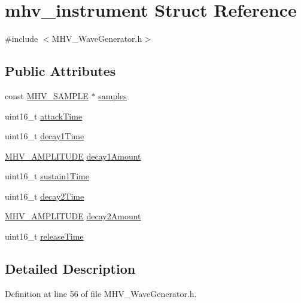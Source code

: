 \hypertarget{structmhv__instrument}{\section{mhv\-\_\-instrument Struct Reference}
\label{structmhv__instrument}
}


{\ttfamily \#include $<$M\-H\-V\-\_\-\-Wave\-Generator.\-h$>$}

\subsection*{Public Attributes}
\begin{DoxyCompactItemize}
\item 
const \hyperlink{_m_h_v___d_a_c_8h_a5ed12db0bcd6a3870733daecfb30e640}{M\-H\-V\-\_\-\-S\-A\-M\-P\-L\-E} $\ast$ \hyperlink{structmhv__instrument_a1a3dd705816f79c9f44da16743f38516}{samples}
\item 
uint16\-\_\-t \hyperlink{structmhv__instrument_a9b85066674551959ac0ef4d57bedfcb5}{attack\-Time}
\item 
uint16\-\_\-t \hyperlink{structmhv__instrument_a8ba9f75ad91b531d497d18bad6351d9d}{decay1\-Time}
\item 
\hyperlink{_m_h_v___wave_generator_8h_ae0ff00bbcfd596fc3d6afab09bb5e11c}{M\-H\-V\-\_\-\-A\-M\-P\-L\-I\-T\-U\-D\-E} \hyperlink{structmhv__instrument_a922f4e32b9e9c1b7e685124845fed1ad}{decay1\-Amount}
\item 
uint16\-\_\-t \hyperlink{structmhv__instrument_aff146a5abc59a0654d31089fe23d623e}{sustain1\-Time}
\item 
uint16\-\_\-t \hyperlink{structmhv__instrument_a68888a2d53929235d2e5379d46968325}{decay2\-Time}
\item 
\hyperlink{_m_h_v___wave_generator_8h_ae0ff00bbcfd596fc3d6afab09bb5e11c}{M\-H\-V\-\_\-\-A\-M\-P\-L\-I\-T\-U\-D\-E} \hyperlink{structmhv__instrument_a54b5eec4d485a7c096377290a2aa5456}{decay2\-Amount}
\item 
uint16\-\_\-t \hyperlink{structmhv__instrument_a376cf3d2ec80de657a1bc947f34eab55}{release\-Time}
\end{DoxyCompactItemize}


\subsection{Detailed Description}


Definition at line 56 of file M\-H\-V\-\_\-\-Wave\-Generator.\-h.



